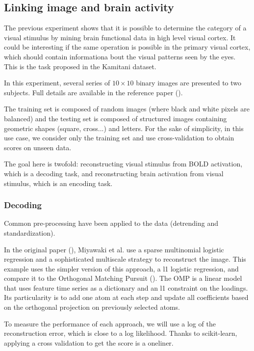 \documentclass{frontiersSCNS} %
\begin{document}
\subsection{Linking image and brain activity}

The previous experiment shows that it is possible to determine the category of a
visual stimulus by mining brain functional data in high level visual cortex. It
could be interesting if the same operation is possible in the primary visual
cortex, which should contain informationa bout the visual patterns seen by the
eyes. This is the task proposed in the Kamitani dataset.

In this experiment, several series of $10\times10$ binary images are presented
to two subjects. Full details are available in the reference paper
(\cite{miyawaki2008}).

The training set is composed of random images (where black and white pixels
are balanced) and the testing set is composed of structured images containing
geometric shapes (square, cross...) and letters. For the sake of simplicity, in
this use case, we consider only the training set and use cross-validation to
obtain scores on unseen data.

The goal here is twofold: reconstructing visual stimulus from BOLD activation,
which is a decoding task, and reconstructing brain activation from visual
stimulus, which is an encoding task.

\subsubsection{Decoding}

Common pre-processing have been applied to the data (detrending and
standardization).

In the original paper (\cite{miyawaki2008}), Miyawaki et al. use a sparse multinomial
logistic regression and a sophisticated multiscale strategy to reconstruct the image.
This example uses the simpler version of this approach, a l1 logistic
regression, and compare it to the Orthogonal
Matching Pursuit (\cite{mallat1993}). The OMP is a linear model that uses
feature time series as a dictionary and an l1 constraint on the loadings. Its
particularity is to add one atom at each step and update all coefficients
based on the orthogonal projection on previously selected atoms.

To measure the performance of each approach, we will use a log of the
reconstruction error, which is close to a log likelihood. Thanks to
scikit-learn, applying a cross validation to get the score is a oneliner.
\end{document}
